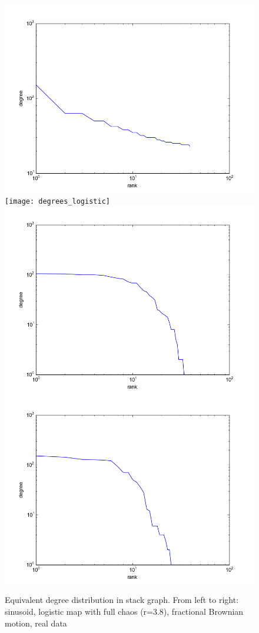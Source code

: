 \documentclass[12pt]{article}
\begin{document}
\begin{figure}\label{fig:stack_ts_degree}
  \begin{center}
    \includegraphics[scale=0.4]{degrees_sinusoid}
    \texttt{[image: degrees\_logistic]}
    \includegraphics[scale=0.4]{degrees_fbm}
    \includegraphics[scale=0.4]{degrees_vr}
  \end{center}
  \caption{Equivalent degree distribution in stack graph. From left to right: sinusoid, logistic map with full chaos (r=3.8), fractional Brownian motion, real data}
\end{figure}
\end{document}
